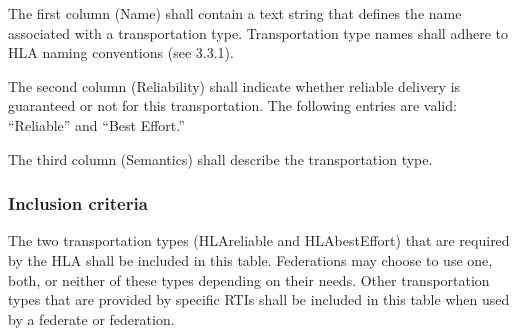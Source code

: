 \vspace{-7pt}
\begingroup
\fontsize{9}{10.9}\selectfont
\setlength{\tabcolsep}{3.5pt}
\renewcommand{\arraystretch}{1.30}
\noindent{}
\endgroup\vspace{6pt}

The first column (Name) shall contain a text string that defines the name associated with a transportation type. Transportation type names shall adhere to HLA naming conventions (see 3.3.1).

The second column (Reliability) shall indicate whether reliable delivery is guaranteed or not for this transportation. The following entries are valid: ``Reliable'' and ``Best Effort.''

\newpage
The third column (Semantics) shall describe the transportation type.

\subsubsection{Inclusion criteria}
The two transportation types (HLAreliable and HLAbestEffort) that are required by the HLA shall be included in this table. Federations may choose to use one, both, or neither of these types depending on their needs. Other transportation types that are provided by specific RTIs shall be included in this table when used by a federate or federation.

